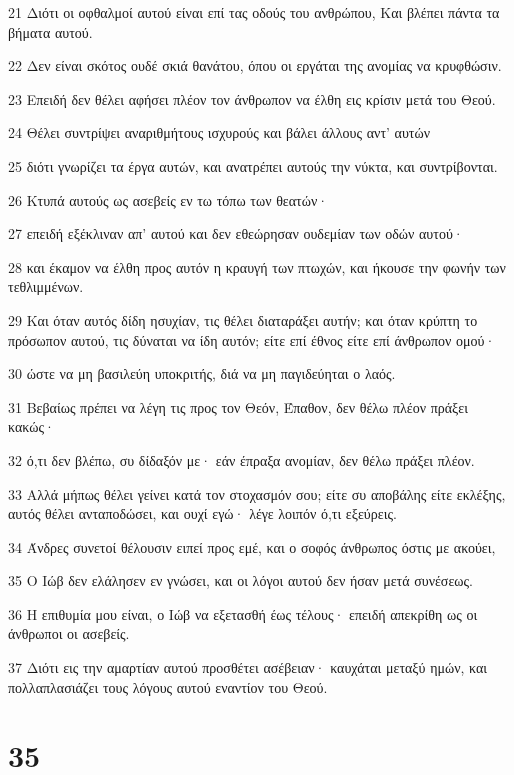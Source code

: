 \par 21 Διότι οι οφθαλμοί αυτού είναι επί τας οδούς του ανθρώπου, Και βλέπει πάντα τα βήματα αυτού.
\par 22 Δεν είναι σκότος ουδέ σκιά θανάτου, όπου οι εργάται της ανομίας να κρυφθώσιν.
\par 23 Επειδή δεν θέλει αφήσει πλέον τον άνθρωπον να έλθη εις κρίσιν μετά του Θεού.
\par 24 Θέλει συντρίψει αναριθμήτους ισχυρούς και βάλει άλλους αντ' αυτών
\par 25 διότι γνωρίζει τα έργα αυτών, και ανατρέπει αυτούς την νύκτα, και συντρίβονται.
\par 26 Κτυπά αυτούς ως ασεβείς εν τω τόπω των θεατών·
\par 27 επειδή εξέκλιναν απ' αυτού και δεν εθεώρησαν ουδεμίαν των οδών αυτού·
\par 28 και έκαμον να έλθη προς αυτόν η κραυγή των πτωχών, και ήκουσε την φωνήν των τεθλιμμένων.
\par 29 Και όταν αυτός δίδη ησυχίαν, τις θέλει διαταράξει αυτήν; και όταν κρύπτη το πρόσωπον αυτού, τις δύναται να ίδη αυτόν; είτε επί έθνος είτε επί άνθρωπον ομού·
\par 30 ώστε να μη βασιλεύη υποκριτής, διά να μη παγιδεύηται ο λαός.
\par 31 Βεβαίως πρέπει να λέγη τις προς τον Θεόν, Έπαθον, δεν θέλω πλέον πράξει κακώς·
\par 32 ό,τι δεν βλέπω, συ δίδαξόν με· εάν έπραξα ανομίαν, δεν θέλω πράξει πλέον.
\par 33 Αλλά μήπως θέλει γείνει κατά τον στοχασμόν σου; είτε συ αποβάλης είτε εκλέξης, αυτός θέλει ανταποδώσει, και ουχί εγώ· λέγε λοιπόν ό,τι εξεύρεις.
\par 34 Άνδρες συνετοί θέλουσιν ειπεί προς εμέ, και ο σοφός άνθρωπος όστις με ακούει,
\par 35 Ο Ιώβ δεν ελάλησεν εν γνώσει, και οι λόγοι αυτού δεν ήσαν μετά συνέσεως.
\par 36 Η επιθυμία μου είναι, ο Ιώβ να εξετασθή έως τέλους· επειδή απεκρίθη ως οι άνθρωποι οι ασεβείς.
\par 37 Διότι εις την αμαρτίαν αυτού προσθέτει ασέβειαν· καυχάται μεταξύ ημών, και πολλαπλασιάζει τους λόγους αυτού εναντίον του Θεού.

\chapter{35}

